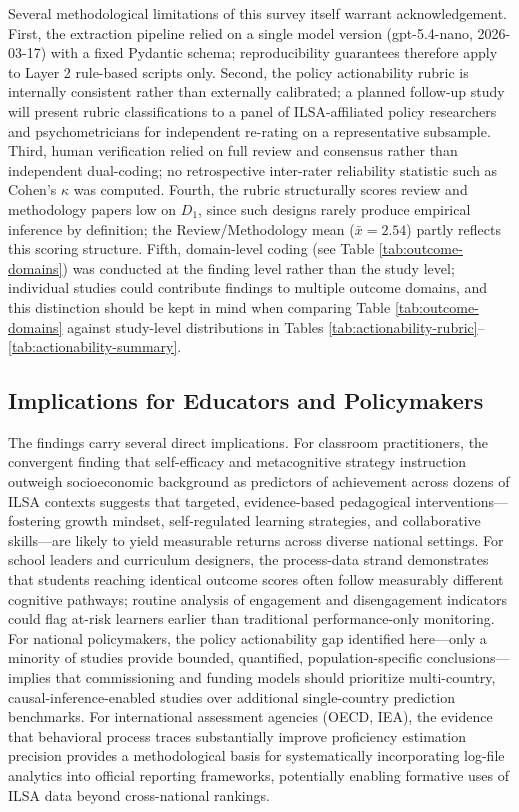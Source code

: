 \documentclass{ieeeaccess}
\begin{document}
Several methodological limitations of this survey itself warrant acknowledgement. First, the extraction pipeline relied on a single model version (gpt-5.4-nano, 2026-03-17) with a fixed Pydantic schema; reproducibility guarantees therefore apply to Layer 2 rule-based scripts only. Second, the policy actionability rubric is internally consistent rather than externally calibrated; a planned follow-up study will present rubric classifications to a panel of ILSA-affiliated policy researchers and psychometricians for independent re-rating on a representative subsample. Third, human verification relied on full review and consensus rather than independent dual-coding; no retrospective inter-rater reliability statistic such as Cohen's $\kappa$ was computed. Fourth, the rubric structurally scores review and methodology papers low on $D_1$, since such designs rarely produce empirical inference by definition; the Review/Methodology mean ($\bar{x} = 2.54$) partly reflects this scoring structure. Fifth, domain-level coding (see Table \ref{tab:outcome-domains}) was conducted at the finding level rather than the study level; individual studies could contribute findings to multiple outcome domains, and this distinction should be kept in mind when comparing Table \ref{tab:outcome-domains} against study-level distributions in Tables \ref{tab:actionability-rubric}--\ref{tab:actionability-summary}.

\subsection{Implications for Educators and Policymakers}
\label{implications}

The findings carry several direct implications. For classroom practitioners, the convergent finding that self-efficacy and metacognitive strategy instruction outweigh socioeconomic background as predictors of achievement across dozens of ILSA contexts suggests that targeted, evidence-based pedagogical interventions---fostering growth mindset, self-regulated learning strategies, and collaborative skills---are likely to yield measurable returns across diverse national settings. For school leaders and curriculum designers, the process-data strand demonstrates that students reaching identical outcome scores often follow measurably different cognitive pathways; routine analysis of engagement and disengagement indicators could flag at-risk learners earlier than traditional performance-only monitoring. For national policymakers, the policy actionability gap identified here---only a minority of studies provide bounded, quantified, population-specific conclusions---implies that commissioning and funding models should prioritize multi-country, causal-inference-enabled studies over additional single-country prediction benchmarks. For international assessment agencies (OECD, IEA), the evidence that behavioral process traces substantially improve proficiency estimation precision provides a methodological basis for systematically incorporating log-file analytics into official reporting frameworks, potentially enabling formative uses of ILSA data beyond cross-national rankings.
\end{document}
